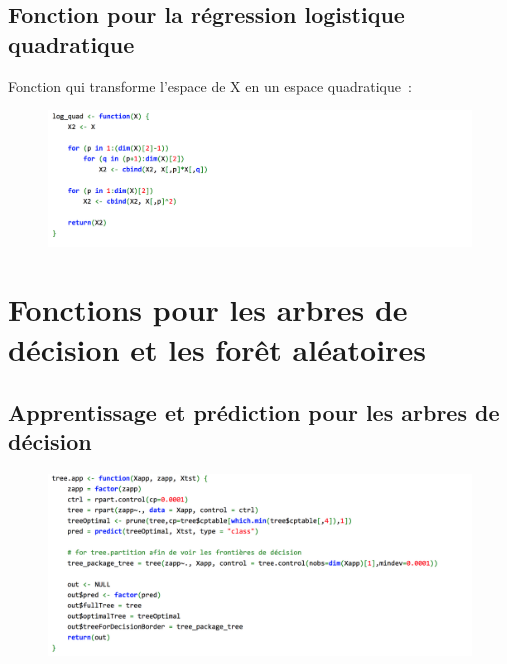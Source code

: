 \documentclass[a4paper,10pt]{report}
\begin{document}
\section{Fonction pour la régression logistique quadratique}
\label{appendix:functions-reg-log-quad}

Fonction qui transforme l'espace de X en un espace quadratique~:
\begin{figure}[H]
	\centering
	\captionsetup{justification=centering, margin=3cm}
	\includegraphics[width=0.9\linewidth]{img/B-log-quad-function}
	\label{fig:B-log-quad-function}
\end{figure}








\chapter{Fonctions pour les arbres de décision et les forêt aléatoires}
\label{appendix:functions-trees-and-forest}

\section{Apprentissage et prédiction pour les arbres de décision}
\label{appendix:functions-trees}
\begin{figure}[H]
	\centering
	\captionsetup{justification=centering, margin=3cm}
	\includegraphics[width=0.9\linewidth]{img/C-tree-app-function}
	\label{C-tree-app-function}
\end{figure}
\end{document}
